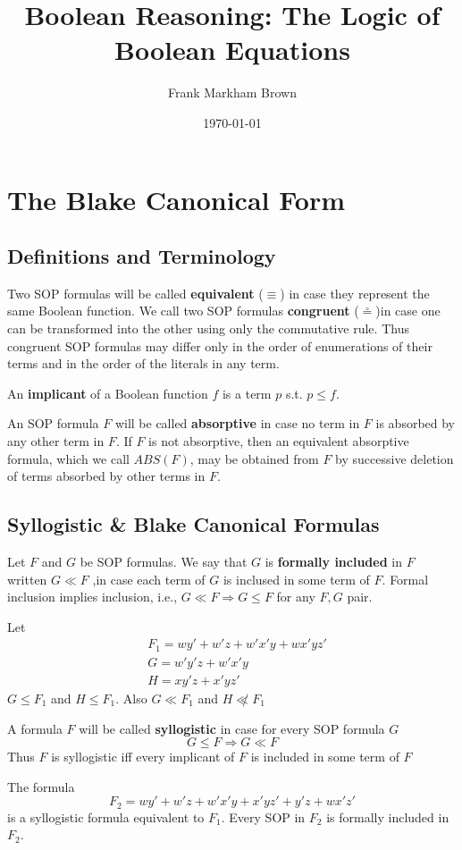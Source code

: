 \documentclass[11pt]{article}
\author{Frank Markham Brown}
\date{\today}
\title{Boolean Reasoning: The Logic of Boolean Equations}
\def \ceq {\overset{\circ}{=}}
\begin{document}
\maketitle
\tableofcontents

\section{The Blake Canonical Form}
\label{sec:org0da07bf}
\subsection{Definitions and Terminology}
\label{sec:org5a2f8c3}
Two SOP formulas will be called \textbf{equivalent} (\(\equiv\)) in case they
represent the same Boolean function. We call two SOP formulas \textbf{congruent} (\(\ceq\))in
case one can be transformed into the other using only the commutative rule.
Thus congruent SOP formulas may differ only in the order of enumerations of
their terms and in the order of the literals in any term.

An \textbf{implicant} of a Boolean function \(f\) is a term \(p\) s.t. \(p\le f\).

An SOP formula \(F\) will be called \textbf{absorptive} in case no term in \(F\) is
absorbed by any other term in \(F\). If \(F\) is not absorptive, then an
equivalent absorptive formula, which we call \(ABS(F)\), may be obtained
from \(F\) by successive deletion of terms absorbed by other terms in \(F\).
\subsection{Syllogistic \& Blake Canonical Formulas}
\label{sec:org84bdfbf}
Let \(F\) and \(G\) be SOP formulas. We say that \(G\) is \textbf{formally included}
in \(F\) written \(G\ll F\) ,in case each term of \(G\) is inclused in some
term of \(F\). Formal inclusion implies inclusion,
i.e., \(G\ll F\Rightarrow G\le F\) for any \(F,G\) pair.

\begin{examplle}[]
Let
\begin{align*}
&F_1=wy'+w'z+w'x'y+wx'yz'\\
&G=w'y'z+w'x'y\\
&H=xy'z+x'yz'
\end{align*}
\(G\le F_1\) and \(H\le F_1\). Also \(G\ll F_1\) and \(H\not\ll F_1\)
\end{examplle}

   A formula \(F\) will be called \textbf{syllogistic} in case for every SOP
formula \(G\)
\begin{equation*}
G\le F\Rightarrow G\ll F
\end{equation*}
Thus \(F\) is syllogistic iff every implicant of \(F\) is included in some
term of \(F\)
\begin{examplle}[]
The formula
\begin{equation*}
F_2=wy'+w'z+w'x'y+x'yz'+y'z+wx'z'
\end{equation*}
is a syllogistic formula equivalent to \(F_1\). Every SOP in \(F_2\) is
formally included in \(F_2\).
\end{examplle}
\end{document}
